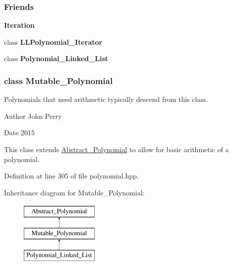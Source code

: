 \subsubsection*{Friends}
\begin{Indent}\textbf{ Iteration}\par
\begin{DoxyCompactItemize}
\item 
\mbox{\label{group__polygroup_adc04ceaa684cbc36bd6800c57364bd2e}} 
class {\bfseries L\+L\+Polynomial\+\_\+\+Iterator}
\item 
\mbox{\label{group__polygroup_a7e28ea806491074003c51b4d857abd6c}} 
class {\bfseries Polynomial\+\_\+\+Linked\+\_\+\+List}
\end{DoxyCompactItemize}
\end{Indent}
\label{class_mutable___polynomial}
\subsubsection{class Mutable\+\_\+\+Polynomial}
Polynomials that need arithmetic typically descend from this class. 

\begin{DoxyAuthor}{Author}
John Perry 
\end{DoxyAuthor}
\begin{DoxyDate}{Date}
2015
\end{DoxyDate}
This class extends \hyperlink{group__polygroup_class_abstract___polynomial}{Abstract\+\_\+\+Polynomial} to allow for basic arithmetic of a polynomial. 

Definition at line 305 of file polynomial.\+hpp.

Inheritance diagram for Mutable\+\_\+\+Polynomial\+:\begin{figure}[H]
\begin{center}
\leavevmode
\includegraphics[height=3.000000cm]{group__polygroup}
\end{center}
\end{figure}
